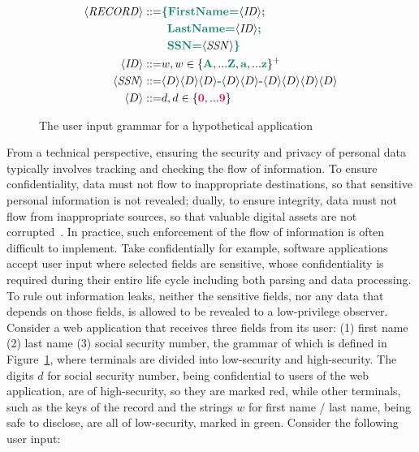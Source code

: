 \begin{figure}[tbp]
  \small
  \begin{align*}
    \langle \mathit{RECORD} \rangle ::= & {\color{green} \textbf{\{FirstName=}} \langle \mathit{ID} \rangle {\color{green} \textbf{;}} \\
                               & \enspace {\color{green} \textbf{LastName=}} \langle \mathit{ID} \rangle {\color{green} \textbf{;}} \\
                               & \enspace {\color{green} \textbf{SSN=}} \langle \mathit{SSN} \rangle {\color{green} \textbf{\}}} \\
    \langle \mathit{ID} \rangle     ::= & w , w \in \{ {\color{green} \textbf{A}}, ... {\color{green} \textbf{Z}}, {\color{green} \textbf{a}}, ... {\color{green} \textbf{z}} \}^{+} \\
    \langle \textit{SSN} \rangle    ::= & \langle D \rangle \langle D \rangle \langle D \rangle {\color{green} \textbf{-}}
                                 \langle D \rangle \langle D \rangle {\color{green} \textbf{-}}
                                 \langle D \rangle \langle D \rangle \langle D \rangle \langle D \rangle \\
    \langle D \rangle      ::= & d , d \in \{ {\color{red} \textbf{0}}, ... {\color{red} \textbf{9}} \}
  \end{align*}
  \caption{The user input grammar for a hypothetical application}
  \label{fig:grammar}
\end{figure}

From a technical perspective, ensuring the security and privacy of personal data
typically involves tracking and checking the flow of information. To ensure
confidentiality, data must not flow to inappropriate destinations, so that
sensitive personal information is not revealed; dually, to ensure integrity,
data must not flow from inappropriate sources, so that valuable digital assets
are not corrupted~\cite{sabelfeld2003language,biba1977integrity}. In practice,
such enforcement of the flow of information is often difficult to implement.
Take confidentially for example, software applications accept user input where
selected fields are sensitive, whose confidentiality is required during their
entire life cycle including both parsing and data processing. To rule out
information leaks, neither the sensitive fields, nor any data that depends on
those fields, is allowed to be revealed to a low-privilege observer. Consider a
web application that receives three fields from its user: (1) first name
(2) last name (3) social security number, the grammar of which
is defined in Figure~\ref{fig:grammar}, where terminals are divided into
low-security and high-security. The digits $d$ for social security number, being
confidential to users of the web application, are of high-security, so they are
marked {\color{red} red}, while other terminals, such as the keys of the record
and the strings $w$ for first name / last name, being safe to disclose, are all
of low-security, marked in {\color{green} green}. Consider the following user
input:

